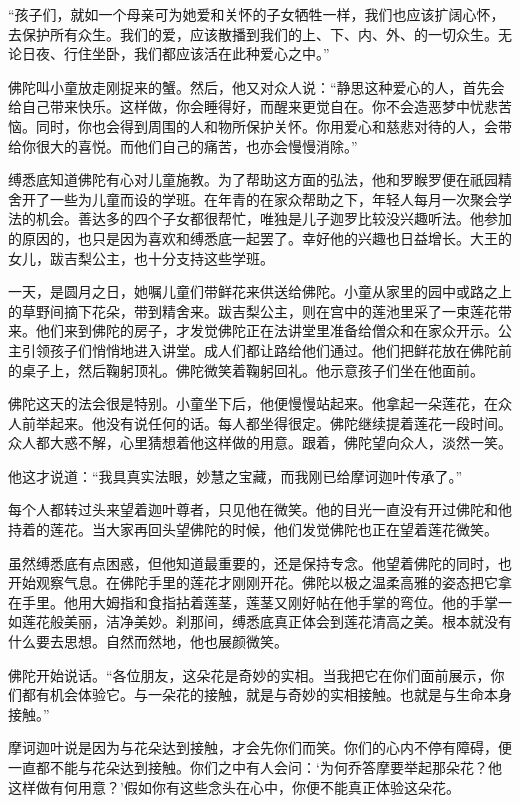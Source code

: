 \documentclass[12pt,twoside,openany]{book}
\begin{document}
“孩子们，就如一个母亲可为她爱和关怀的子女牺牲一样，我们也应该扩阔心怀，去保护所有众生。我们的爱，应该散播到我们的上、下、内、外、的一切众生。无论日夜、行住坐卧，我们都应该活在此种爱心之中。”

佛陀叫小童放走刚捉来的蟹。然后，他又对众人说：“静思这种爱心的人，首先会给自己带来快乐。这样做，你会睡得好，而醒来更觉自在。你不会造恶梦中忧悲苦恼。同时，你也会得到周围的人和物所保护关怀。你用爱心和慈悲对待的人，会带给你很大的喜悦。而他们自己的痛苦，也亦会慢慢消除。”

缚悉底知道佛陀有心对儿童施教。为了帮助这方面的弘法，他和罗睺罗便在祇园精舍开了一些为儿童而设的学班。在年青的在家众帮助之下，年轻人每月一次聚会学法的机会。善达多的四个子女都很帮忙，唯独是儿子迦罗比较没兴趣听法。他参加的原因的，也只是因为喜欢和缚悉底一起罢了。幸好他的兴趣也日益增长。大王的女儿，跋吉梨公主，也十分支持这些学班。

一天，是圆月之日，她嘱儿童们带鲜花来供送给佛陀。小童从家里的园中或路之上的草野间摘下花朵，带到精舍来。跋吉梨公主，则在宫中的莲池里采了一束莲花带来。他们来到佛陀的房子，才发觉佛陀正在法讲堂里准备给僧众和在家众开示。公主引领孩子们悄悄地进入讲堂。成人们都让路给他们通过。他们把鲜花放在佛陀前的桌子上，然后鞠躬顶礼。佛陀微笑着鞠躬回礼。他示意孩子们坐在他面前。

佛陀这天的法会很是特别。小童坐下后，他便慢慢站起来。他拿起一朵莲花，在众人前举起来。他没有说任何的话。每人都坐得很定。佛陀继续提着莲花一段时间。众人都大惑不解，心里猜想着他这样做的用意。跟着，佛陀望向众人，淡然一笑。

他这才说道：“我具真实法眼，妙慧之宝藏，而我刚已给摩诃迦叶传承了。”

每个人都转过头来望着迦叶尊者，只见他在微笑。他的目光一直没有开过佛陀和他持着的莲花。当大家再回头望佛陀的时候，他们发觉佛陀也正在望着莲花微笑。

虽然缚悉底有点困惑，但他知道最重要的，还是保持专念。他望着佛陀的同时，也开始观察气息。在佛陀手里的莲花才刚刚开花。佛陀以极之温柔高雅的姿态把它拿在手里。他用大姆指和食指拈着莲茎，莲茎又刚好帖在他手掌的弯位。他的手掌一如莲花般美丽，洁净美妙。刹那间，缚悉底真正体会到莲花清高之美。根本就没有什么要去思想。自然而然地，他也展颜微笑。

佛陀开始说话。“各位朋友，这朵花是奇妙的实相。当我把它在你们面前展示，你们都有机会体验它。与一朵花的接触，就是与奇妙的实相接触。也就是与生命本身接触。”

摩诃迦叶说是因为与花朵达到接触，才会先你们而笑。你们的心内不停有障碍，便一直都不能与花朵达到接触。你们之中有人会问：‘为何乔答摩要举起那朵花？他这样做有何用意？’假如你有这些念头在心中，你便不能真正体验这朵花。
\end{document}
